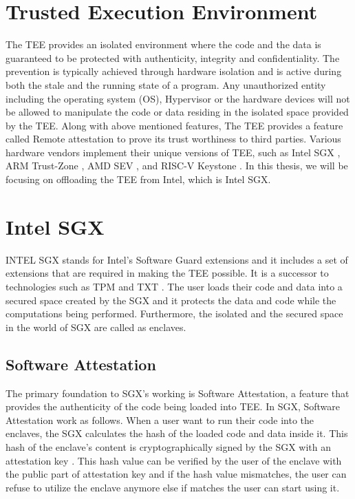 \documentclass[article, doublespace,nopageskip]{VTthesis} %
\begin{document}
    \section{Trusted Execution Environment} \label{ase:TEE}
    The TEE provides an isolated environment where the code and the data is guaranteed to be protected with authenticity, integrity and confidentiality. The prevention is typically achieved through hardware isolation and is active during both the stale and the running state of a program. Any unauthorized entity including the operating system (OS), Hypervisor or the hardware devices will not be allowed to manipulate the code or data residing in the isolated space provided by the TEE. Along with above mentioned features, The TEE provides a feature called Remote attestation to prove its trust worthiness to third parties. Various hardware vendors implement their unique versions of TEE, such as Intel SGX \cite{Intel-SGX}, ARM Trust-Zone \cite{ARM-TrustZone}, AMD SEV \cite{AMD-SEV}, and RISC-V Keystone \cite{RISCVKeystone}. In this thesis, we will be focusing on offloading the TEE from Intel, which is Intel SGX.

    \section{Intel SGX} \label{ase:Intel SGX}
    INTEL SGX stands for Intel's Software Guard extensions and it includes a set of extensions that are required in making the TEE possible. It is a successor to technologies such as TPM \cite{TPM} and TXT \cite{TXT}. The user loads their code and data into a secured space created by the SGX and it protects the data and code while the computations being performed. Furthermore, the isolated and the secured space in the world of SGX are called as enclaves.

    \subsection{Software Attestation} \label{ss: Software Attestation}
    The primary foundation to SGX's working is Software Attestation, a feature that provides the authenticity of the code being loaded into TEE. In SGX, Software Attestation work as follows. When a user want to run their code into the enclaves, the SGX calculates the hash of the loaded code and data inside it. This hash of the enclave's content is cryptographically signed by the SGX with an attestation key \cite{Intel-SGX}. This hash value can be verified by the user of the enclave with the public part of attestation key and if the hash value mismatches, the user can refuse to utilize the enclave anymore else if matches the user can start using it. 
    
\end{document}
